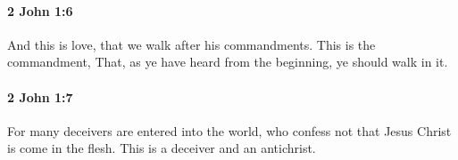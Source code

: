 		\paragraph{2 John 1:6} %
			\label{2JOHN-1-6}

			And this is love, that we walk after his commandments.  This is the commandment, That, as ye have heard from the beginning, ye should walk in it.

			\begin{framed}
			\scriptsize
				\begin{compactdesc}
					\item[SBLG] 
				\end{compactdesc}
			\end{framed}

		\paragraph{2 John 1:7} %
			\label{2JOHN-1-7}

			For many deceivers are entered into the world, who confess not that Jesus Christ is come in the flesh.  This is a deceiver and an antichrist.

